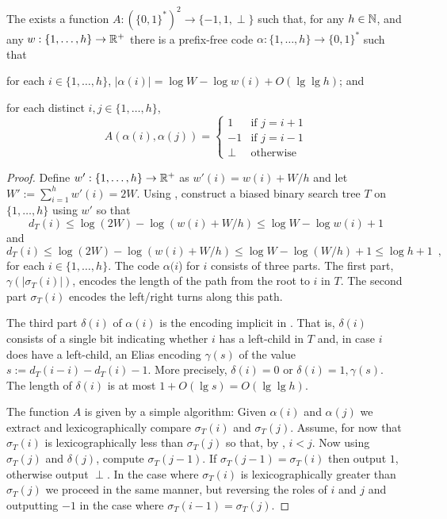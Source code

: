 \documentclass[kpfonts]{patmorin}
\begin{document}
\begin{lem}
  The exists a function $A:(\{0,1\}^*)^2\to\{-1,1,\perp\}$ such that, for any $h\in\mathbb{N}$, and any $w:\{1,\ldots,h\}\to\mathbb{R}^+$ there is a prefix-free code $\alpha:\{1,\ldots,h\}\to \{0,1\}^*$ such that 
  \begin{compactenum}
    \item for each $i\in\{1,\ldots,h\}$, $|\alpha(i)|=\log W -\log w(i) + O(\lg\lg h)$; and
    \item for each distinct $i,j\in\{1,\ldots,h\}$, 
    \[   A(\alpha(i),\alpha(j)) 
    = \begin{cases}
       1 & \text{if $j=i+1$} \\
       -1 & \text{if $j=i-1$} \\
       \perp & \text{otherwise}
      \end{cases}
      \]
    \end{compactenum}
\end{lem}


\begin{proof}
  Define $w':\{1,\ldots,h\}\to \mathbb{R}^+$ as $w'(i)=w(i)+W/h$ and let $W':=\sum_{i=1}^h w'(i)=2W$.
  Using , construct a biased binary search tree $T$ on $\{1,\ldots,h\}$ using $w'$ so that 
  \[   
    d_T(i)\le\log (2W)-\log(w(i)+W/h) \le \log W-\log w(i)+1
  \]
  and
  \[
  d_T(i)\le\log (2W)-\log(w(i)+W/h) \le \log W-\log (W/h)+1 \le \log h + 1\enspace ,
  \]
  for each $i\in\{1,\ldots,h\}$.  The code $\alpha(i$) for $i$ consists of three parts.  The first part, $\gamma(|\sigma_T(i)|)$, encodes the length of the path from the root to $i$ in $T$. The second part $\sigma_T(i)$ encodes the left/right turns along this path.  
  
  The third part $\delta(i)$ of $\alpha(i)$ is the encoding implicit in .  That is, $\delta(i)$ consists of
  a single bit indicating whether $i$ has a left-child in $T$ and, in case $i$ does have a left-child, an Elias encoding $\gamma(s)$ of the value $s:=d_T(i-i)-d_T(i)-1$.  More precisely, $\delta(i)=0$ or $\delta(i)=1,\gamma(s)$.  The length of $\delta(i)$ is at most $1+O(\lg s)=O(\lg\lg h)$.

  The function $A$ is given by a simple algorithm: Given $\alpha(i)$ and $\alpha(j)$ we extract and lexicographically compare $\sigma_T(i)$ and $\sigma_T(j)$.  Assume, for now that $\sigma_T(i)$ is lexicographically less than $\sigma_T(j)$ so that, by , $i < j$.  Now using $\sigma_T(j)$ and $\delta(j)$, compute $\sigma_T(j-1)$.  If $\sigma_T(j-1)=\sigma_T(i)$ then output $1$, otherwise output $\perp$.
  In the case where $\sigma_T(i)$ is lexicographically greater than $\sigma_T(j)$ we proceed in the same manner, but reversing the roles of $i$ and $j$ and outputting $-1$ in the case where $\sigma_T(i-1)=\sigma_T(j)$.
\end{proof}
\end{document}
